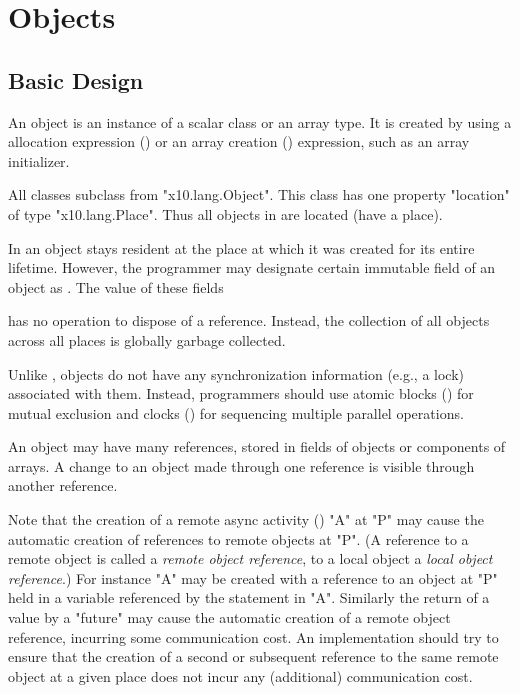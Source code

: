 \chapter{Objects}\label{XtenObjects}

\section{Basic Design}
An object is an instance of a scalar class or an array type.  It is
created by using a allocation expression
() or an array creation
() expression, such as an array
initializer. 

All classes subclass from \xcd"x10.lang.Object".
This class has one property \xcd"location" of type
\xcd"x10.lang.Place".  Thus all objects in \Xten{}
are located (have a place). 

In \XtenCurrVer{} an object stays resident at the place at
which it was created for its entire lifetime. However, the
programmer may designate certain immutable field of an object
as . The value of these fields 

{}\Xten{} has no operation to dispose of a reference.  Instead, the
collection of all objects across all places is globally garbage
collected.

Unlike \java{},
{}\Xten{} objects do not have any synchronization information (e.g.,
a lock) associated with them. 
Instead, programmers should use atomic blocks
() for mutual exclusion and clocks
() for sequencing multiple parallel operations.

An object may have many references, stored in fields of
objects or components of arrays. A change to an object made through
one reference is visible through another reference. 

Note that the creation of a remote async activity
() \xcd"A" at \xcd"P" may cause the automatic creation of
references to remote objects at \xcd"P". (A reference to a remote
object is called a {\em remote object reference}, to a local object a
{\em local object reference}.)  For instance \xcd"A" may be created
with a reference to an object at \xcd"P" held in a variable referenced
by the statement in \xcd"A".  Similarly the return of a value by a
\xcd"future" may cause the automatic creation of a remote object
reference, incurring some communication cost.  An {}\Xten{}
implementation should try to ensure that the creation of a second or
subsequent reference to the same remote object at a given place does
not incur any (additional) communication cost.

